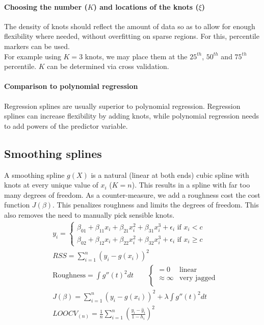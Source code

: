 \documentclass[../document.tex]{subfiles}
\begin{document}
	\paragraph{Choosing the number ($K$) and locations of the knots ($\xi$)}
	The density of knots should reflect the amount of data so as to allow for enough flexibility where needed, without overfitting on sparse regions. For this, percentile markers can be used.\\
	For example using $K=3$ knots, we may place them at the $25^{th}$, $50^{th}$ and $75^{th}$ percentile. $K$ can be determined via cross validation.

	\paragraph{Comparison to polynomial regression}
	Regression splines are usually superior to polynomial regression. Regression splines can increase flexibility by adding knots, while polynomial regression needs to add powers of the predictor variable.

	\sectionbreak
	\subsection{Smoothing splines}
	A smoothing spline $g(X)$ is a natural (linear at both ends) cubic spline with knots at every unique value of $x_{i}$ ($K=n$). This results in a spline with far too many degrees of freedom. As a counter-measure, we add a roughness cost the cost function $J(\beta)$. This penalizes roughness and limits the degrees of freedom. This also removes the need to manually pick sensible knots.
	\begin{equation}
	\begin{split}
		&y_{i}=\begin{cases}
			\beta_{01}+\beta_{11}x_{i}+\beta_{21}x_{i}^2+\beta_{31}x_{i}^3+\epsilon_{i} \text{  if  } x_{i} < c\\
			\beta_{02}+\beta_{12}x_{i}+\beta_{22}x_{i}^2+\beta_{32}x_{i}^3+\epsilon_{i} \text{  if  } x_{i} \geq c
		\end{cases}\\
		&RSS=\sum_{i=1}^{n}(y_{i}-g(x_{i}))^2\\
		&\text{Roughness} = \int g''(t)^2dt \qquad \begin{cases}
			=0 & \text{linear}\\
			\approx \infty & \text{very jagged}\\
		\end{cases}\\
		&J(\beta)=\sum_{i=1}^{n}(y_{i}-g(x_{i}))^2+\lambda\int g''(t)^2dt\\
		&LOOCV_{(n)}=\frac{1}{n}\sum_{i=1}^{n}(\frac{y_{i}-\hat{y}_{i}}{1-h_{i}})^2\\
	\end{split}
	\end{equation}
\end{document}
